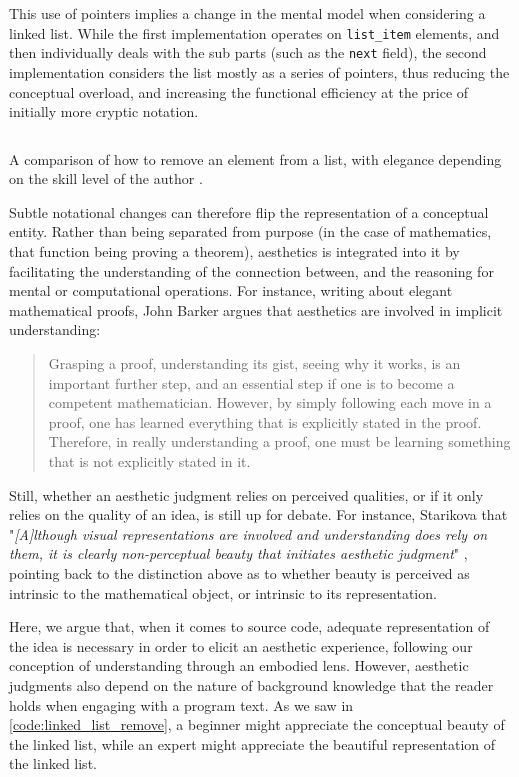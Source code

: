 This use of pointers implies a change in the mental model when considering a linked list. While the first implementation operates on \lstinline{list_item} elements, and then individually deals with the sub parts (such as the \lstinline{next} field), the second implementation considers the list mostly as a series of pointers, thus reducing the conceptual overload, and increasing the functional efficiency at the price of initially more cryptic notation.

\begin{listing}
    \inputminted{c}{./corpus/linked_list.c}
    \caption{A comparison of how to remove an element from a list, with elegance depending on the skill level of the author \citep{kirchner_linked_2022a}.}
    \label{code:linked_list_remove}
\end{listing}

Subtle notational changes can therefore flip the representation of a conceptual entity. Rather than being separated from purpose (in the case of mathematics, that function being proving a theorem), aesthetics is integrated into it by facilitating the understanding of the connection between, and the reasoning for mental or computational operations. For instance, writing about elegant mathematical proofs, John Barker argues that aesthetics are involved in implicit understanding:

\begin{quote}
    Grasping a proof, understanding its gist, seeing why it works, is an important further step, and an essential step if one is to become a competent mathematician. However, by simply following each move in a proof, one has learned everything that is explicitly stated in the proof. Therefore, in really understanding a proof, one must be learning something that is not explicitly stated in it. \citep{barker_mathematical_beauty}
\end{quote}

Still, whether an aesthetic judgment relies on perceived qualities, or if it only relies on the quality of an idea, is still up for debate. For instance, Starikova that "\emph{[A]lthough visual representations are involved and understanding does rely on them, it is clearly non-perceptual beauty that initiates aesthetic judgment}" \citep{starikova_aesthetic_2018}, pointing back to the distinction above as to whether beauty is perceived as intrinsic to the mathematical object, or intrinsic to its representation.

Here, we argue that, when it comes to source code, adequate representation of the idea is necessary in order to elicit an aesthetic experience, following our conception of understanding through an embodied lens. However, aesthetic judgments also depend on the nature of background knowledge that the reader holds when engaging with a program text. As we saw in \ref{code:linked_list_remove}, a beginner might appreciate the conceptual beauty of the linked list, while an expert might appreciate the beautiful representation of the linked list.

